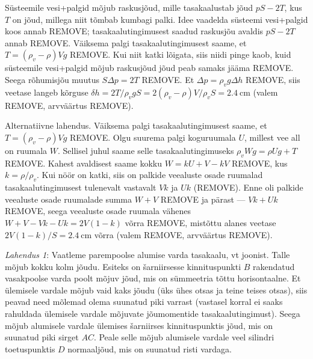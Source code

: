 \documentclass[10pt]{article}
\newcommand{\p}[1]{REMOVE}
\begin{document}

\solu
Süsteemile vesi+palgid mõjub raskusjõud, mille tasakaalustab jõud $pS-2T$, kus $T$ on jõud, millega niit tõmbab kumbagi palki. Idee vaadelda süsteemi vesi+palgid koos annab \p{2}; tasakaalutingimusest saadud raskusjõu avaldis $pS-2T$ annab \p{2}. Väiksema palgi tasakaalutingimusest saame, et $T=(\rho_v- \rho)Vg$ \p{1}. Kui niit katki lõigata, siis niidi pinge kaob, kuid süsteemile vesi+palgid mõjub raskusjõud jõud peab samaks jääma \p{1}. Seega rõhumisjõu muutus $S\Delta p=2T$ \p{1}. Et $\Delta p=\rho_vg\Delta h$ \p{1}, siis veetase langeb kõrguse $\delta h=2T/\rho_vgS=2(\rho_v- \rho)V/\rho_vS=\SI{2.4}{\cm}$ (valem \p{1}, arvväärtus \p{1}).

Alternatiivne lahendus.  Väiksema palgi tasakaalutingimusest saame, et $T=(\rho_v- \rho)Vg$ \p{1}. Olgu suurema palgi koguruumala $U$, millest vee all on ruumala $W$. Sellisel juhul saame selle tasakaalutingimuseks $\rho_v Wg= \rho Ug+T$ \p{1}. Kahest avaldisest saame kokku $W=kU+V-kV$ \p{1}, kus $k=\rho/\rho_v$. Kui nöör on katki, siis on palkide veealuste osade ruumalad tasakaalutingimusest tulenevalt vastavalt $Vk$ ja $Uk$ (\p{1+1}). Enne oli palkide veealuste osade ruumalade summa $W+V$ \p{1} ja pärast --- $Vk+Uk$ \p{1}, seega veealuste osade ruumala vähenes $W+V-Vk-Uk=2V(1-k)$ võrra \p{1}, mistõttu alanes veetase $2V(1-k)/S=\SI{2.4}{\cm}$ võrra (valem \p{1}, arvväärtus \p{1}).
\probend
\bigskip


\solu
\textit{Lahendus 1}: Vaatleme parempoolse alumise varda tasakaalu, vt joonist. Talle mõjub kokku kolm jõudu. Esiteks on šarniirsesse kinnituspunkti $B$ rakendatud vasakpoolse varda poolt mõjuv jõud, mis on sümmeetria tõttu horisontaalne. Et ülemisele vardale mõjub vaid kaks jõudu (üks ühes otsas ja teine teises otsas), siis peavad need mõlemad olema suunatud piki varrast (vastasel korral ei saaks rahuldada ülemisele vardale mõjuvate  jõumomentide tasakaalutingimust). Seega mõjub alumisele vardale ülemises šarniirses kinnituspunktis jõud, mis on suunatud piki sirget $AC$. Peale selle mõjub alumisele vardale veel silindri toetuspunktis $D$ normaaljõud, mis on suunatud risti vardaga.
\end{document}
